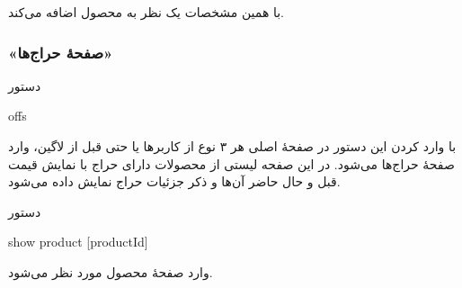 \documentclass[]{article}
\begin{document}
با همین مشخصات یک نظر به محصول اضافه می‌کند.

\newpage

\subsubsection*{{\titr «صفحهٔ حراج‌ها»}}


\begin{mybox}[colback=yellow]{دستور}

\begin{latin}

offs

\end{latin}

\end{mybox}

با وارد کردن این دستور در صفحهٔ اصلی هر ۳ نوع از کاربرها یا حتی قبل از لاگین، وارد صفحهٔ حراج‌ها می‌شود. در این صفحه لیستی از محصولات دارای حراج با نمایش قیمت قبل و حال حاضر آن‌ها و ذکر جزئیات حراج نمایش داده می‌شود.


\hrulefill

\begin{mybox}[colback=yellow]{دستور}

\begin{latin}

show product [productId]

\end{latin}

\end{mybox}

وارد صفحهٔ محصول مورد نظر می‌شود.
\end{document}
